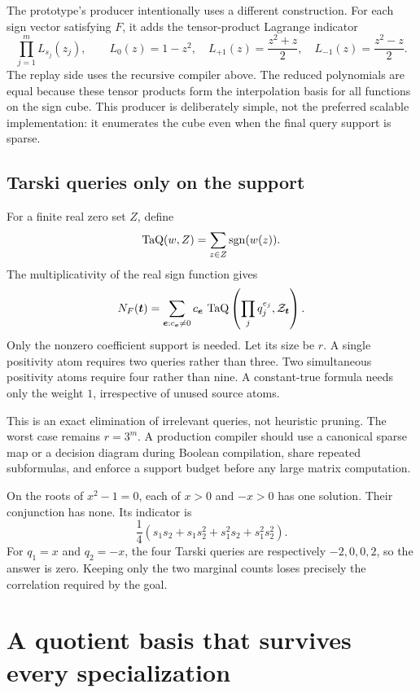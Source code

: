 The prototype's producer intentionally uses a different construction. For each sign vector satisfying $F$, it adds the tensor-product Lagrange indicator
\[
\prod_{j=1}^m L_{s_j}(z_j),\qquad
L_0(z)=1-z^2,\quad L_{+1}(z)=\frac{z^2+z}{2},\quad
L_{-1}(z)=\frac{z^2-z}{2}.
\]
The replay side uses the recursive compiler above. The reduced polynomials are equal because these tensor products form the interpolation basis for all functions on the sign cube. This producer is deliberately simple, not the preferred scalable implementation: it enumerates the cube even when the final query support is sparse.

\subsection{Tarski queries only on the support}

For a finite real zero set $Z$, define
\[
\operatorname{TaQ}(w,Z)=\sum_{z\in Z}\operatorname{sgn}(w(z)).
\]
The multiplicativity of the real sign function gives
\begin{equation}\label{eq:indicatorcount}
N_F(\bm t)=\sum_{\bm e:c_{\bm e}\ne0}c_{\bm e}\,
\operatorname{TaQ}\left(\prod_jq_j^{e_j},\mathcal Z_{\bm t}\right).
\end{equation}
Only the nonzero coefficient support is needed. Let its size be $r$. A single positivity atom requires two queries rather than three. Two simultaneous positivity atoms require four rather than nine. A constant-true formula needs only the weight $1$, irrespective of unused source atoms.

This is an exact elimination of irrelevant queries, not heuristic pruning. The worst case remains $r=3^m$. A production compiler should use a canonical sparse map or a decision diagram during Boolean compilation, share repeated subformulas, and enforce a support budget before any large matrix computation.

\begin{example}\label{ex:correlation}
On the roots of $x^2-1=0$, each of $x>0$ and $-x>0$ has one solution. Their conjunction has none. Its indicator is
\[
\frac14\left(s_1s_2+s_1s_2^2+s_1^2s_2+s_1^2s_2^2\right).
\]
For $q_1=x$ and $q_2=-x$, the four Tarski queries are respectively $-2,0,0,2$, so the answer is zero. Keeping only the two marginal counts loses precisely the correlation required by the goal.
\end{example}

\section{A quotient basis that survives every specialization}\label{sec:tower}

